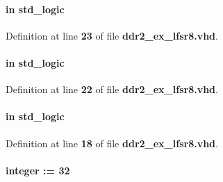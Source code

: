 \paragraph[{load}]{ {\bfseries \textcolor{keywordflow}{in}\textcolor{vhdlchar}{ }} {\bfseries \textcolor{comment}{std\+\_\+logic}\textcolor{vhdlchar}{ }} \hspace{0.3cm}{\ttfamily [Port]}}\label{classddr2__ex__lfsr8_aba761f7740d0b6257a0e283b3734ddbf}


Definition at line {\bf 23} of file {\bf ddr2\+\_\+ex\+\_\+lfsr8.\+vhd}.

\paragraph[{pause}]{ {\bfseries \textcolor{keywordflow}{in}\textcolor{vhdlchar}{ }} {\bfseries \textcolor{comment}{std\+\_\+logic}\textcolor{vhdlchar}{ }} \hspace{0.3cm}{\ttfamily [Port]}}\label{classddr2__ex__lfsr8_a52b981743c97198e7eb35d800caca99f}


Definition at line {\bf 22} of file {\bf ddr2\+\_\+ex\+\_\+lfsr8.\+vhd}.

\paragraph[{reset\+\_\+n}]{ {\bfseries \textcolor{keywordflow}{in}\textcolor{vhdlchar}{ }} {\bfseries \textcolor{comment}{std\+\_\+logic}\textcolor{vhdlchar}{ }} \hspace{0.3cm}{\ttfamily [Port]}}\label{classddr2__ex__lfsr8_a446ea52ed8c4a84181a47d9165ce41a5}


Definition at line {\bf 18} of file {\bf ddr2\+\_\+ex\+\_\+lfsr8.\+vhd}.

\paragraph[{seed}]{ {\bfseries \textcolor{vhdlchar}{ }} {\bfseries \textcolor{comment}{integer}\textcolor{vhdlchar}{ }\textcolor{vhdlchar}{ }\textcolor{vhdlchar}{\+:}\textcolor{vhdlchar}{=}\textcolor{vhdlchar}{ }\textcolor{vhdlchar}{ } \textcolor{vhdldigit}{32} \textcolor{vhdlchar}{ }} \hspace{0.3cm}{\ttfamily [Generic]}}\label{classddr2__ex__lfsr8_a47e3b4a3e9c1e506a321bea15966fae8}


